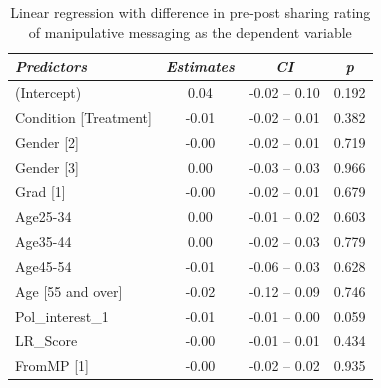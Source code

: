 \documentclass[empirical, authordate, issue]{jote-new-article}
\begin{document}
\begin{table}

  \caption{Linear regression with difference in pre-post sharing rating of manipulative messaging as the dependent variable }
  \label{tab:tableS35}


  \begin{tabularx}{\linewidth}{@{} X  S  S  S@{}}

    \toprule
    \emph{Predictors}                                    & {\emph{Estimates}}                         & {\emph{\emph{CI}}} & {\emph{p}} \\
    \midrule
    (Intercept)                                          & 0.04                                       & -0.02 -- 0.10      & 0.192      \\
    Condition [Treatment]                                & -0.01                                      & -0.02 -- 0.01      & 0.382      \\
    Gender [2]                                           & -0.00                                      & -0.02 -- 0.01      & 0.719      \\
    Gender [3]                                           & 0.00                                       & -0.03 -- 0.03      & 0.966      \\
    Grad [1]                                             & -0.00                                      & -0.02 -- 0.01      & 0.679      \\
    Age25-34                                             & 0.00                                       & -0.01 -- 0.02      & 0.603      \\
    Age35-44                                             & 0.00                                       & -0.02 -- 0.03      & 0.779      \\
    Age45-54                                             & -0.01                                      & -0.06 -- 0.03      & 0.628      \\
    Age [55 and over]                                    & -0.02                                      & -0.12 -- 0.09      & 0.746      \\
    Pol\_interest\_1                                     & -0.01                                      & -0.01 -- 0.00      & 0.059      \\
    LR\_Score                                            & -0.00                                      & -0.01 -- 0.01      & 0.434      \\
    FromMP [1]                                           & -0.00                                      & -0.02 -- 0.02      & 0.935      \\

\end{tabularx}
\end{table}
\end{document}
